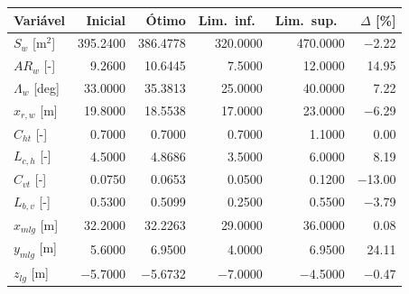 \begin{tabular}{lrrrrr}
\toprule
Variável & Inicial & Ótimo & Lim.\ inf.\ & Lim.\ sup.\ & $\Delta$ [\%] \\
\midrule
$S_w$ [m$^2$] & 395.2400 & 386.4778 & 320.0000 & 470.0000 & $-$2.22 \\
$AR_w$ [-] & 9.2600 & 10.6445 & 7.5000 & 12.0000 & 14.95 \\
$\Lambda_w$ [deg] & 33.0000 & 35.3813 & 25.0000 & 40.0000 & 7.22 \\
$x_{r,w}$ [m] & 19.8000 & 18.5538 & 17.0000 & 23.0000 & $-$6.29 \\
$C_{ht}$ [-] & 0.7000 & 0.7000 & 0.7000 & 1.1000 & 0.00 \\
$L_{c,h}$ [-] & 4.5000 & 4.8686 & 3.5000 & 6.0000 & 8.19 \\
$C_{vt}$ [-] & 0.0750 & 0.0653 & 0.0500 & 0.1200 & $-$13.00 \\
$L_{b,v}$ [-] & 0.5300 & 0.5099 & 0.2500 & 0.5500 & $-$3.79 \\
$x_{mlg}$ [m] & 32.2000 & 32.2263 & 29.0000 & 36.0000 & 0.08 \\
$y_{mlg}$ [m] & 5.6000 & 6.9500 & 4.0000 & 6.9500 & 24.11 \\
$z_{lg}$ [m] & $-$5.7000 & $-$5.6732 & $-$7.0000 & $-$4.5000 & $-$0.47 \\
\bottomrule
\end{tabular}